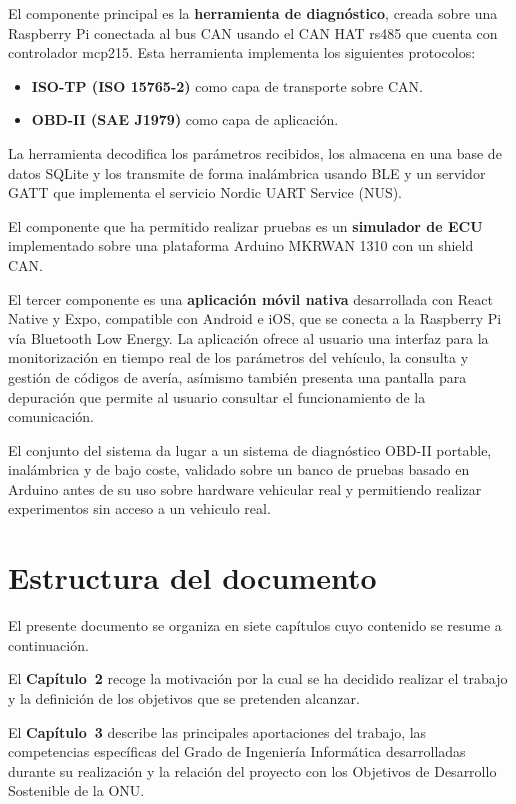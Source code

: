 El componente principal es la \textbf{herramienta de diagnóstico}, creada sobre una Raspberry Pi conectada al bus CAN usando el CAN HAT rs485 que cuenta con controlador mcp215. Esta herramienta implementa los siguientes protocolos: 
\begin{itemize}
    \item \textbf{ISO-TP (ISO 15765-2)} como capa de transporte sobre CAN.
    \item \textbf{OBD-II (SAE J1979)} como capa de aplicación.
\end{itemize}
La herramienta decodifica los parámetros recibidos, los almacena en una base de datos SQLite y los transmite de forma inalámbrica usando BLE y un servidor GATT que implementa el servicio Nordic UART Service (NUS).

El componente que ha permitido realizar pruebas es un \textbf{simulador de ECU} implementado sobre una plataforma Arduino MKRWAN 1310 con un shield CAN.

El tercer componente es una \textbf{aplicación móvil nativa} desarrollada con React Native y Expo, compatible con Android e iOS, que se conecta a la Raspberry Pi vía Bluetooth Low Energy. La aplicación ofrece al usuario una interfaz para la monitorización en tiempo real de los parámetros del vehículo, la consulta y gestión de códigos de avería, asímismo también presenta una pantalla para depuración que permite al usuario consultar el funcionamiento de la comunicación.

El conjunto del sistema da lugar a un sistema de diagnóstico OBD-II portable, inalámbrica y de bajo coste, validado sobre un banco de pruebas basado en Arduino antes de su uso sobre hardware vehicular real y permitiendo realizar experimentos sin acceso a un vehiculo real.

\section{Estructura del documento}

El presente documento se organiza en siete capítulos cuyo contenido se resume a continuación.

El \textbf{Capítulo~2} recoge la motivación por la cual se ha decidido realizar el trabajo y la definición de los objetivos que se pretenden alcanzar.

El \textbf{Capítulo~3} describe las principales aportaciones del trabajo, las competencias específicas del Grado de Ingeniería Informática desarrolladas durante su realización y la relación del proyecto con los Objetivos de Desarrollo Sostenible de la ONU.

